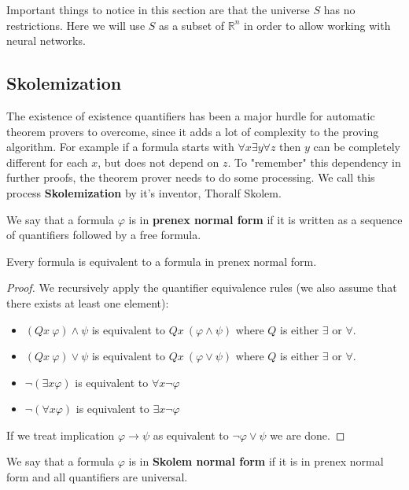 Important things to notice in this section are that the universe $S$ has no restrictions. Here we will use $S$ as a subset of $\mathbb{R}^n$ in order to allow working with neural networks. 

\subsection{Skolemization}
The existence of existence quantifiers has been a major hurdle for automatic theorem provers to overcome, since it adds a lot of complexity to the proving algorithm. For example if a formula starts with $\forall x \exists y \forall z$ then $y$ can be completely different for each $x$, but does not depend on $z$. To "remember" this dependency in further proofs, the theorem prover needs to do some processing. We call this process \textbf{Skolemization} by it's inventor, Thoralf Skolem.

\begin{defn}
	We say that a formula $\varphi$ is in \textbf{prenex normal form} if it is written as a sequence of quantifiers followed by a free formula.
\end{defn}

\begin{thm}
	Every formula is equivalent to a formula in prenex normal form.
\end{thm}
\begin{proof}
	We recursively apply the quantifier equivalence rules (we also assume that there exists at least one element):
	\begin{itemize}
		\item $(Q x\ \varphi)\wedge\psi$ is equivalent to $Q x\ (\varphi\wedge\psi)$ where $Q$ is either $\exists$ or $\forall$. 
		\item $(Q x\ \varphi)\vee\psi$ is equivalent to $Q x\ (\varphi\vee\psi)$ where $Q$ is either $\exists$ or $\forall$. 
		\item $\neg(\exists x\varphi)$ is equivalent to $\forall x \neg \varphi$
		\item $\neg(\forall x\varphi)$ is equivalent to $\exists x \neg \varphi$
	\end{itemize}
If we treat implication $\varphi \rightarrow \psi$ as equivalent to $\neg \varphi \vee \psi$ we are done.
\end{proof}

\begin{defn}
	We say that a formula $\varphi$ is in \textbf{Skolem normal form} if it is in prenex normal form and all quantifiers are universal.
\end{defn}

